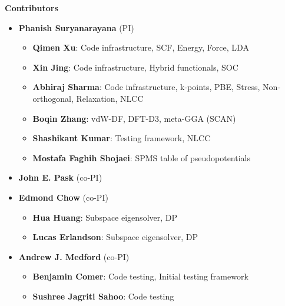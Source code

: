   \begin{frame}[allowframebreaks]{\textbf{Contributors}} \label{Contributors}

	\begin{itemize}
	\item \textbf{Phanish Suryanarayana} (PI)
	\begin{itemize}
 	    \item \textbf{Qimen Xu}: Code infrastructure, SCF, Energy, Force, LDA \\  
        \item \textbf{Xin Jing}: Code infrastructure, Hybrid functionals, SOC \\  
 	    \item \textbf{Abhiraj Sharma}: Code infrastructure, k-points, PBE, Stress, Non-orthogonal, Relaxation, NLCC \\   
 	    \item \textbf{Boqin Zhang}: vdW-DF, DFT-D3, meta-GGA (SCAN) \\  
 	    \item \textbf{Shashikant Kumar}: Testing framework, NLCC \\  
            \item \textbf{Mostafa Faghih Shojaei}: SPMS table of pseudopotentials \\  
 	\end{itemize}
    \item \textbf{John E. Pask} (co-PI)
    \item \textbf{Edmond Chow} (co-PI)
    \begin{itemize}
        \item \textbf{Hua Huang}: Subspace eigensolver, DP
        \item \textbf{Lucas Erlandson}: Subspace eigensolver, DP
    \end{itemize}
    \item \textbf{Andrew J. Medford} (co-PI)
    \begin{itemize}
        \item \textbf{Benjamin Comer}: Code testing, Initial testing framework
        \item \textbf{Sushree Jagriti Sahoo}: Code testing
    \end{itemize}
 	\end{itemize}
  
\end{frame}


